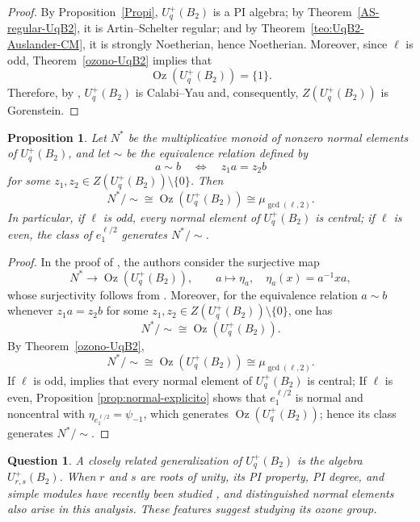 \documentclass[11pt]{article}
\newtheorem{proposition}[theorem]{Proposition}
\newtheorem*{question*}{Question}
\theoremstyle{definition}
\begin{document}
\begin{proof}
By Proposition~\ref{Propi}, \(U_q^{+}(B_2)\) is a PI algebra; by
Theorem~\ref{AS-regular-UqB2}, it is Artin--Schelter regular; and by
Theorem~\ref{teo:UqB2-Auslander-CM}, it is strongly Noetherian, hence
Noetherian. Moreover, since \(\ell\) is odd,
Theorem~\ref{ozono-UqB2} implies that
$$
\operatorname{Oz}(U_q^{+}(B_2))=\{1\}.
$$
Therefore, by \cite[Theorem~1.11]{ChanGaddisWonZhang2025},
\(U_q^{+}(B_2)\) is Calabi--Yau and, consequently,
\(Z(U_q^{+}(B_2))\) is Gorenstein.
\end{proof}
\begin{proposition}
\label{prop:normales-ozono-UqB2}
Let \(N^*\) be the multiplicative monoid of nonzero normal elements of
\(U_q^{+}(B_2)\), and let \(\sim\) be the equivalence relation defined by
$$
a\sim b
\quad\Longleftrightarrow\quad
z_1a=z_2b
$$
for some
\(z_1,z_2\in Z(U_q^{+}(B_2))\setminus\{0\}\). Then
$$
N^*/{\sim}
\cong
\operatorname{Oz}(U_q^{+}(B_2))
\cong
\mu_{\gcd(\ell,2)}.
$$
In particular, if \(\ell\) is odd, every normal element of
\(U_q^{+}(B_2)\) is central; if \(\ell\) is even, the class of \(e_1^{\ell/2}\) generates
\(N^*/{\sim}\).
\end{proposition}
\begin{proof}
In the proof of \cite[Lemma~1.10]{ChanGaddisWonZhang2025}, the authors
consider the surjective map
$$
N^*\longrightarrow\operatorname{Oz}(U_q^{+}(B_2)),
\qquad
a\longmapsto\eta_a,\quad \eta_a(x)=a^{-1}xa,
$$
whose surjectivity follows from
\cite[Lemma~1.9]{ChanGaddisWonZhang2025}. Moreover, for the equivalence
relation \(a\sim b\) whenever \(z_1a=z_2b\) for some
\(z_1,z_2\in Z(U_q^{+}(B_2))\setminus\{0\}\), one has
$$
N^*/{\sim}\cong\operatorname{Oz}(U_q^{+}(B_2)).
$$
By Theorem~\ref{ozono-UqB2},
$$
N^*/{\sim}\cong\operatorname{Oz}(U_q^{+}(B_2))
\cong\mu_{\gcd(\ell,2)}.
$$
If \(\ell\) is odd, \cite[Lemma~1.10]{ChanGaddisWonZhang2025}
implies that every normal element of \(U_q^{+}(B_2)\) is central; If \(\ell\) is even, Proposition
\ref{prop:normal-explicito} shows that \(e_1^{\ell/2}\) is normal and
noncentral with \(\eta_{e_1^{\ell/2}}=\psi_{-1}\), which generates
\(\operatorname{Oz}(U_q^{+}(B_2))\); hence its class generates
\(N^*/{\sim}\).
\end{proof}

\begin{question*}
A closely related generalization of \(U_q^{+}(B_2)\) is the algebra
\(U_{r,s}^{+}(B_2)\). When \(r\) and \(s\) are roots of unity, its PI
property, PI degree, and simple modules have recently been studied
\cite{MukherjeePandey2025}, and distinguished normal elements also arise
in this analysis. These features suggest studying its ozone group.
\end{question*}
\end{document}
